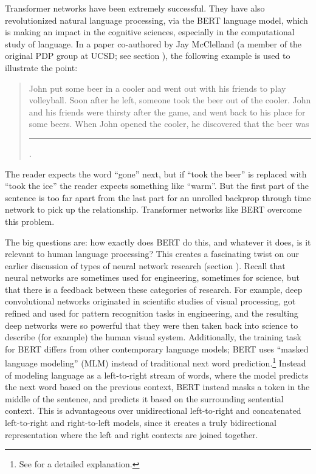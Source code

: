 Transformer networks have been extremely successful. They have also revolutionized natural language processing, via the BERT language model, which is making an impact in the cognitive sciences, especially in the computational study of language. In a paper co-authored by Jay McClelland  \cite{mcclelland2020placing} (a member of the original PDP group at UCSD; see section ), the following example is used to illustrate the point:
\begin{quote}
John put some beer in a cooler and went out with his friends to play volleyball. Soon after he left, someone took the beer out of the cooler. John and his friends were thirsty after the game, and went back to his place for some beers. When John opened the cooler, he discovered that the beer was \rule{1cm}{0.15mm}.
\end{quote}
The reader expects the word ``gone'' next, but if ``took the beer'' is replaced with ``took the ice'' the reader expects something like ``warm''. But the first part of the sentence is too far apart from the last part for an unrolled backprop through time network to pick up the relationship.  Transformer networks like BERT overcome this problem.

The big questions are: how exactly does BERT do this, and whatever it does, is it relevant to human language processing?  This creates a fascinating twist on our earlier discussion of types of neural network research (section ). Recall that neural networks are sometimes used for engineering, sometimes for science, but that there is a feedback between these categories of research. For example, deep convolutional networks originated in scientific studies of visual processing, got refined and used for pattern recognition tasks in engineering, and the resulting deep networks were so powerful that they were then taken back into science  to describe (for example) the human visual system.
Additionally, the training task for BERT differs from other contemporary language models; BERT uses ``masked language modeling'' (MLM) instead of traditional next word prediction.\footnote{See \cite{devlin2018bert} for a detailed explanation.} Instead of modeling language as a left-to-right stream of words, where the model predicts the next word based on the previous context, BERT instead masks a token in the middle of the sentence, and predicts it based on the surrounding sentential context. This is advantageous over unidirectional left-to-right and concatenated left-to-right and right-to-left models, since it creates a truly bidirectional representation where the left and right contexts are joined together.

